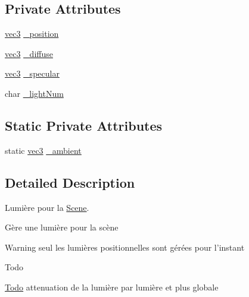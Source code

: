 \subsection*{Private Attributes}
\begin{DoxyCompactItemize}
\item 
\hyperlink{structvec3}{vec3} \hyperlink{class_light_a3af8c823a869606782bd9e1872586b72}{\+\_\+position}
\item 
\hyperlink{structvec3}{vec3} \hyperlink{class_light_a32445f2054766ef532c29eb514b2599d}{\+\_\+diffuse}
\item 
\hyperlink{structvec3}{vec3} \hyperlink{class_light_a36414dc1e8a75b36652bc5a12b2ea43d}{\+\_\+specular}
\item 
char \hyperlink{class_light_a072b63fbb9a1269db4241e09db7588b1}{\+\_\+light\+Num}
\end{DoxyCompactItemize}
\subsection*{Static Private Attributes}
\begin{DoxyCompactItemize}
\item 
static \hyperlink{structvec3}{vec3} \hyperlink{class_light_ab139b739498b75944c99203027332ad9}{\+\_\+ambient}
\end{DoxyCompactItemize}


\subsection{Detailed Description}
Lumière pour la \hyperlink{class_scene}{Scene}. 

Gère une lumière pour la scène

\begin{DoxyWarning}{Warning}
seul les lumières positionnelles sont gérées pour l'instant 
\end{DoxyWarning}
\begin{DoxyRefDesc}{Todo}
\item[\hyperlink{todo__todo000001}{Todo}]attenuation de la lumière par lumière et plus globale \end{DoxyRefDesc}


